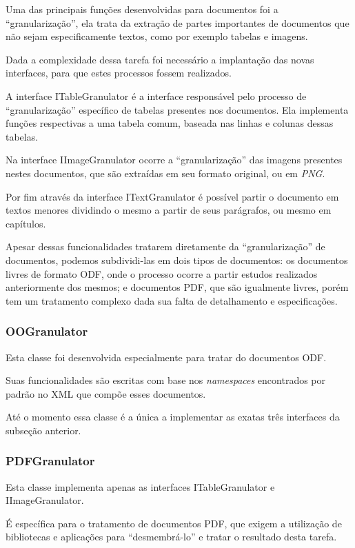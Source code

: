 Uma das principais funções desenvolvidas para documentos foi a ``granularização'', ela trata da extração de partes importantes de documentos que não sejam especificamente textos, como por exemplo tabelas e imagens. 

Dada a complexidade dessa tarefa foi necessário a implantação das novas interfaces, para que estes processos fossem realizados.

A interface ITableGranulator é a interface responsável pelo processo de ``granularização'' específico de tabelas presentes nos documentos. Ela implementa funções respectivas a uma tabela comum, baseada nas linhas e colunas dessas tabelas.

Na interface IImageGranulator ocorre a ``granularização'' das imagens presentes nestes documentos, que são extraídas em seu formato original, ou em \textit{PNG}.

Por fim através da interface ITextGranulator é possível partir o documento em textos menores dividindo o mesmo a partir de seus parágrafos, ou mesmo em capítulos.

Apesar dessas funcionalidades tratarem diretamente da ``granularização'' de documentos, podemos subdividi-las em dois tipos de documentos: os documentos livres de formato ODF, onde o processo ocorre a partir estudos realizados anteriormente dos mesmos; e documentos PDF, que são igualmente livres, porém tem um tratamento complexo dada sua falta de detalhamento e especificações.


\subsubsection{OOGranulator}

Esta classe foi desenvolvida especialmente para tratar do documentos ODF.

Suas funcionalidades são escritas com base nos \textit{namespaces} encontrados por padrão no XML que compõe esses documentos.

Até o momento essa classe é a única a implementar as exatas três interfaces da subseção anterior.


\subsubsection{PDFGranulator}

Esta classe implementa apenas as interfaces ITableGranulator e IImageGranulator.

É específica para o tratamento de documentos PDF, que exigem a utilização de bibliotecas e aplicações para ``desmembrá-lo'' e tratar o resultado desta tarefa.


